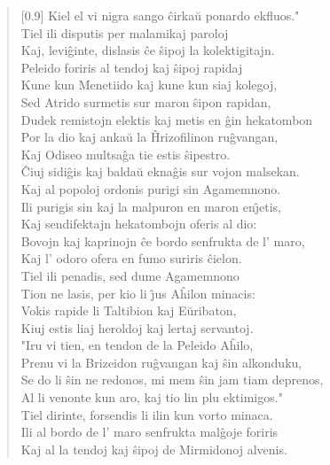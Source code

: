 \begin{verse}[0.9\textwidth]
          Kiel el vi nigra sango \^cirka\u u ponardo ekfluos."\\
           \vin  Tiel ili disputis per malamikaj paroloj\\
          Kaj, levi\^ginte, dislasis \^ce \^sipoj la kolektigitajn.\\
          Peleido foriris al tendoj kaj \^sipoj rapidaj\\
          Kune kun Menetiido kaj kune kun siaj kolegoj,\\
          Sed Atrido surmetis sur maron \^sipon rapidan,\\
          Dudek remistojn elektis kaj metis en \^gin hekatombon\\
          Por la dio kaj anka\u u la \^Hrizofilinon ru\^gvangan,\\
          Kaj Odiseo multsa\^ga tie estis \^sipestro.\\
          \^Ciuj sidi\^gis kaj balda\u u ekna\^gis sur vojon malsekan.\\
          \vin   Kaj al popoloj ordonis purigi sin Agamemnono.\\
          Ili purigis sin kaj la malpuron en maron en\^{\j}etis,\\
          Kaj sendifektajn hekatombojn oferis al dio:\\
          Bovojn kaj kaprinojn \^ce bordo senfrukta de l' maro,\\
          Kaj l' odoro ofera en fumo suriris \^cielon.\\
          \vin   Tiel ili penadis, sed dume Agamemnono\\
          Tion ne lasis, per kio li \^{\j}us A\^hilon minacis:\\
          Vokis rapide li Taltibion kaj E\u uribaton,\\
          Kiuj estis liaj heroldoj kaj lertaj servantoj.\\
           \vin  "Iru vi tien, en tendon de la Peleido A\^hilo,\\
          Prenu vi la Brizeidon ru\^gvangan kaj \^sin alkonduku,\\
          Se do li \^sin ne redonos, mi mem \^sin jam tiam deprenos,\\
          Al li venonte kun aro, kaj tio lin plu ektimigos."\\
          \vin   Tiel dirinte, forsendis li ilin kun vorto minaca.\\
          Ili al bordo de l' maro senfrukta mal\^goje foriris\\
          Kaj al la tendoj kaj \^sipoj de Mirmidonoj alvenis.\\

\end{verse}
